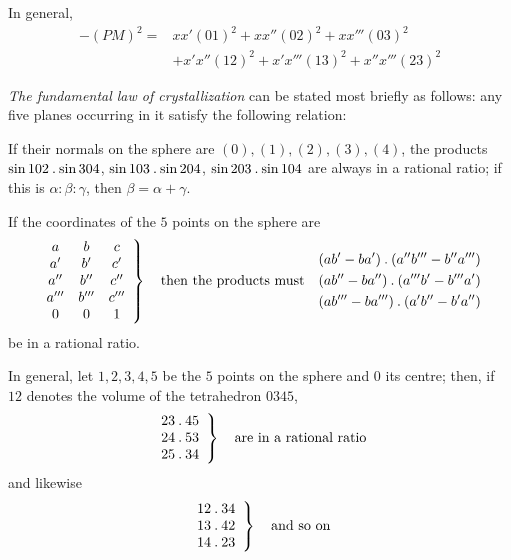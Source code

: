 In general,
\[
\begin{aligned}
-(PM)^2={}&xx'(01)^2+xx''(02)^2+xx'''(03)^2\\
&+x'x''(12)^2+x'x'''(13)^2+x''x'''(23)^2
\end{aligned}
\]

\emph{The fundamental law of crystallization} can be stated most briefly as follows: any five planes occurring in it satisfy the following relation:

If their normals on the sphere are $(0),(1),(2),(3),(4)$, the products $\sin102\mathbin{.}\sin304$, $\sin103\mathbin{.}\sin204$, $\sin203\mathbin{.}\sin104$ are always in a rational ratio; if this is $\alpha:\beta:\gamma$, then $\beta=\alpha+\gamma$.

If the coordinates of the $5$ points on the sphere are
\[
\left.\begin{array}{ccc}
a&b&c\\a'&b'&c'\\a''&b''&c''\\a'''&b'''&c'''\\0&0&1
\end{array}\right\}
\quad\text{then the products must}\quad
\begin{gathered}
(ab'-ba')\mathbin{.}(a''b'''-b''a''')\\
(ab''-ba'')\mathbin{.}(a'''b'-b'''a')\\
(ab'''-ba''')\mathbin{.}(a'b''-b'a'')
\end{gathered}
\]
be in a rational ratio.

In general, let $1,2,3,4,5$ be the $5$ points on the sphere and $0$ its centre; then, if $12$ denotes the volume of the tetrahedron $0345$,
\[
\left.\begin{array}{c}23\mathbin{.}45\\24\mathbin{.}53\\25\mathbin{.}34\end{array}\right\}
\quad\text{are in a rational ratio}
\]
and likewise
\[
\left.\begin{array}{c}12\mathbin{.}34\\13\mathbin{.}42\\14\mathbin{.}23\end{array}\right\}\quad\text{and so on}
\]
